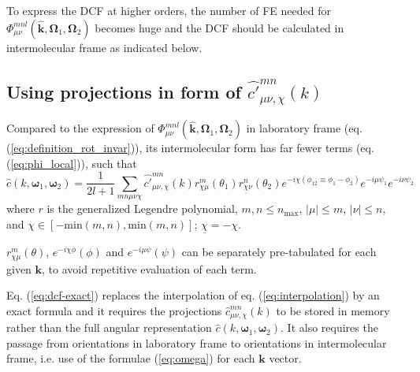 To express the \acs{DCF} at higher orders, the number of \acs{FE}
needed for $\Phi_{\mu\nu}^{mnl}(\mathbf{\hat{k}},\mathbf{\Omega}_{1},\mathbf{\Omega}_{2})$
becomes huge and the \acs{DCF} should be calculated in intermolecular
frame as indicated below.

\subsection{Using projections in form of $\hat{c'}_{\mu\nu,\chi}^{mn}(k)$\label{subsec:Using-projections-in-1}}

Compared to the expression of $\Phi_{\mu\nu}^{mnl}(\mathbf{\hat{k}},\mathbf{\Omega}_{1},\mathbf{\Omega}_{2})$
in laboratory frame (eq. (\ref{eq:definition_rot_invar})), its intermolecular
form has far fewer terms (eq. (\ref{eq:phi_local})), such that
\begin{equation}
\hat{c}(k,\boldsymbol{\omega}_{1},\boldsymbol{\omega}_{2})=\frac{1}{2l+1}\sum_{mn\mu\nu\chi}\hat{c'}_{\mu\nu,\chi}^{mn}(k)r_{\chi\mu}^{m}(\theta_{1})r_{\underline{\chi}\nu}^{n}(\theta_{2})e^{-i\chi(\phi_{12}\equiv\phi_{1}-\phi_{2})}e^{-i\mu\psi_{1}}e^{-i\nu\psi_{2}}\label{eq:dcf-exact}
\end{equation}
where $r$ is the generalized Legendre polynomial, $m,n\leq n{}_{\mathrm{max}}$,
$\left|\mu\right|\leq m$, $\left|\nu\right|\leq n$, and $\chi\in\left[-\mathrm{min}(m,n),\mathrm{min}(m,n)\right]$;
$\underline{\chi}=-\chi$.

$r_{\chi\mu}^{m}(\theta)$, $e^{-i\chi\phi}(\phi)$ and $e^{-i\mu\psi}(\psi)$
can be separately pre-tabulated for each given $\mathbf{k}$, to avoid
repetitive evaluation of each term.

Eq. (\ref{eq:dcf-exact}) replaces the interpolation of eq. (\ref{eq:interpolation})
by an exact formula and it requires the projections $\hat{c}_{\mu\nu,\chi}^{mn}(k)$
to be stored in memory rather than the full angular representation
$\hat{c}(k,\boldsymbol{\omega}_{1},\boldsymbol{\omega}_{2})$. It
also requires the passage from orientations in laboratory frame to
orientations in intermolecular frame, i.e. use of the formulae (\ref{eq:omega})
for each $\mathbf{k}$ vector.
